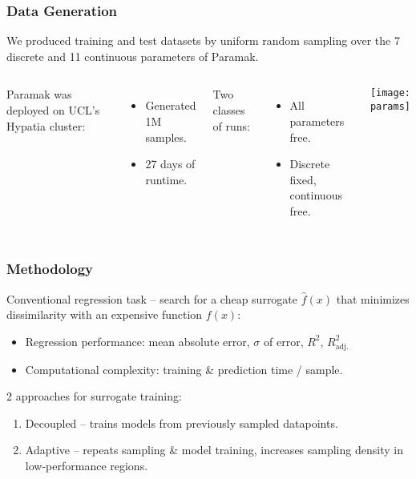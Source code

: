 \begin{frame}
	\frametitle{Data Generation}
	We produced training and test datasets by uniform random sampling over the 7 discrete and 11 continuous parameters of Paramak.\newline
	 \begin{columns}[onlytextwidth,T]
      \column{\dimexpr\linewidth-7cm-5mm}
        
        Paramak was deployed on UCL's Hypatia cluster:
        \begin{itemize}
            \item Generated 1M samples.
            \item 27 days of runtime.
        \end{itemize}
        
        	\vspace{10pt}
        
        Two classes of runs:
        \begin{itemize}
            \item All parameters free.
            \item Discrete fixed, continuous free.
        \end{itemize}
        
      \column{7cm}
      \vspace{-0.5cm}
      \texttt{[image: params]}

    \end{columns}
\end{frame}


\begin{frame}
	\frametitle{Methodology}
		Conventional regression task -- search for a cheap surrogate $\hat{f}(x)$ that
		minimizes dissimilarity with an expensive function $f(x)$:

		\begin{itemize}
			\item
				Regression performance: mean absolute error, $\sigma$ of
				error, $R^2$, $R^2_\text{adj.}$
			\item
				Computational complexity:
				training \& prediction time / sample.
		\end{itemize}

		\vspace{2em}

		2 approaches for surrogate training:
		\begin{enumerate}
			\item
				Decoupled -- trains models from previously sampled
				datapoints.
			\item
				Adaptive -- repeats sampling \& model training, increases
				sampling density in low-performance regions.
		\end{enumerate}
\end{frame}

